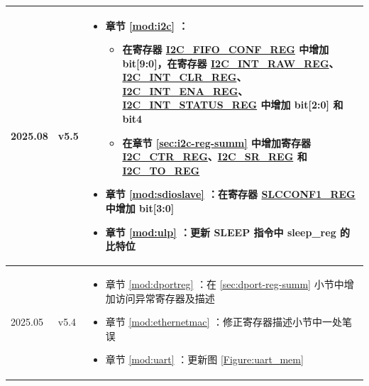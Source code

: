 \begin{longtable}[l]{ | m{2cm} | m{1.5cm} | m{12cm} | }
2025.08 & v5.5 &
\vspace{0.5em}
\begin{itemize}
    \item 章节 \ref{mod:i2c} \textit{\nameref{mod:i2c}}：
        \begin{itemize}
            \item 在寄存器 \hyperref [regdesc:I2CFIFOCONFREG]{I2C\_FIFO\_CONF\_REG} 中增加 bit[9:0]，在寄存器 \hyperref [regdesc:I2CINTRAWREG]{I2C\_INT\_RAW\_REG}、\hyperref [regdesc:I2CINTCLRREG]{I2C\_INT\_CLR\_REG}、\hyperref [regdesc:I2CINTENAREG]{I2C\_INT\_ENA\_REG}、\hyperref [regdesc:I2CINTSTATUSREG]{I2C\_INT\_STATUS\_REG} 中增加 bit[2:0] 和 bit4
            \item 在章节 \ref{sec:i2c-reg-summ} \textit{\nameref{sec:i2c-reg-summ}} 中增加寄存器 \hyperref[regdesc:I2CCTRREG]{I2C\_CTR\_REG}、\hyperref[regdesc:I2CSRREG]{I2C\_SR\_REG} 和 \hyperref[regdesc:I2CTOREG]{I2C\_TO\_REG}
        \end{itemize}
    \item 章节 \ref{mod:sdioslave} \textit{\nameref{mod:sdioslave}}：在寄存器 \hyperref[regdesc:SLCCONF1SLCCONF1REG]{SLCCONF1\_REG} 中增加 bit[3:0]
    \item 章节 \ref{mod:ulp} \textit{\nameref{mod:ulp}}：更新 SLEEP 指令中 sleep\_reg 的比特位
\end{itemize}
\vspace{-1em}
\\\hline


2025.05 & v5.4 &
\vspace{0.5em}
 \begin{itemize}
        \item 章节 \ref{mod:dportreg} \textit{\nameref{mod:dportreg}}：在 \ref{sec:dport-reg-summ} \textit{\nameref{sec:dport-reg-summ}} 小节中增加访问异常寄存器及描述
        \item 章节 \ref{mod:ethernetmac} \textit{\nameref{mod:ethernetmac}}：修正寄存器描述小节中一处笔误
        \item 章节 \ref{mod:uart} \textit{\nameref{mod:uart}}：更新图 \ref{Figure:uart_mem} \textit{\nameref{Figure:uart_mem}}
\end{itemize}
\vspace{-1em}
\\\hline


\end{longtable}
